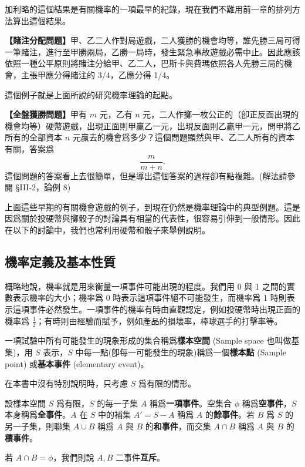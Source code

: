 加利略的這個結果是有關機率的一項最早的紀錄，現在我們不難用前一章的排列方法算出這個結果。

\medskip
\noindent\textbf{【賭注分配問題】}甲、乙二人作對局遊戲，二人獲勝的機會均等，誰先勝三局可得一筆賭注，進行至甲勝兩局，乙勝一局時，發生緊急事故遊戲必需中止。因此應該依照一種公平原則將賭注分給甲、乙二人，巴斯卡與費瑪依照各人先勝三局的機會，主張甲應分得賭注的 3/4，乙應分得 1/4。

這個例子就是上面所說的研究機率理論的起點。

\medskip
\noindent\textbf{【全盤獲勝問題】}甲有 $m$ 元，乙有 $n$ 元，二人作擲一枚公正的（卽正反面出現的機會均等）硬幣遊戲，出現正面則甲贏乙一元，出現反面則乙贏甲一元，問甲將乙所有的全部資本 $n$ 元贏去的機會爲多少？這個問題顯然與甲、乙二人所有的資本有關，答案爲
\[
\frac{m}{m+n}.
\]
這個問題的答案看上去很簡單，但是導出這個答案的過程卻有點複雜。(解法請參閱 §III-2，論例 8)

上面這些早期的有關機會遊戲的例子，到現在仍然是機率理論中的典型例題。這是因爲關於投硬幣與擲骰子的討論具有相當的代表性，很容易引伸到一般情形。因此在以下的討論中，我們也常利用硬幣和骰子來舉例說明。

\subsection{機率定義及基本性質}\label{sec:b5s-3-1}

概略地說，機率就是用來衡量一項事件可能出現的程度。我們用 0 與 1 之間的實數表示機率的大小；機率爲 0 時表示這項事件絕不可能發生，而機率爲 1 時則表示這項事件必然發生。一項事件的機率有時由直觀認定，例如投硬幣時出現正面的機率爲 $\frac{1}{2}$；有時則由經驗而賦予，例如產品的損壞率，棒球選手的打擊率等。

\medskip
\begin{definition*}
一項試驗中所有可能發生的現象形成的集合稱爲\textbf{樣本空間} (Sample space 也叫做基集)，用 $S$ 表示，$S$ 中每一點(卽每一可能發生的現象)稱爲一個\textbf{樣本點} (Sample point) 或\textbf{基本事件} (elementary event)。
\end{definition*}

在本書中沒有特別說明時，只考慮 $S$ 爲有限的情形。

\medskip
\begin{definition*}
設樣本空間 $S$ 爲有限，$S$ 的每一子集 $A$ 稱爲\textbf{一項事件}。空集合 $\phi$ 稱爲\textbf{空事件}，$S$ 本身稱爲\textbf{全事件}。$A$ 在 $S$ 中的補集 $A'=S-A$ 稱爲 $A$ 的\textbf{餘事件}。若 $B$ 爲 $S$ 的另一子集，則聯集 $A \cup B$ 稱爲 $A$ 與 $B$ 的\textbf{和事件}，而交集 $A \cap B$ 稱爲 $A$ 與 $B$ 的\textbf{積事件}。

若 $A \cap B = \phi$，我們則說 $A, B$ 二事件\textbf{互斥}。
\end{definition*}

